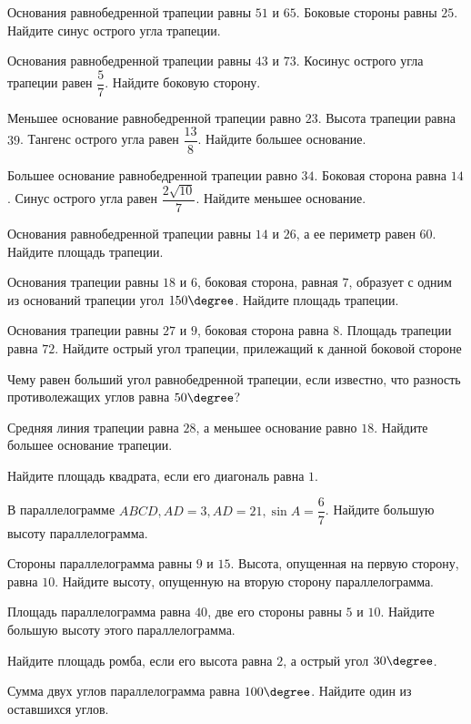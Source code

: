 \begin{class}[number=7]
	\begin{listofex}
		\item Основания равнобедренной трапеции равны \(51\) и \(65\). Боковые стороны равны \(25\). Найдите синус острого угла трапеции.
		\item Основания равнобедренной трапеции равны \(43\) и \(73\). Косинус острого угла трапеции равен \(\dfrac{5}{7}\).  Найдите боковую сторону.
		\item Меньшее основание равнобедренной трапеции равно \(23\). Высота трапеции равна \(39\). Тангенс острого угла равен \(\dfrac{13}{8}\).  Найдите большее основание.
		\item Большее основание равнобедренной трапеции равно \(34\). Боковая сторона равна \(14\). Синус острого угла равен \( \dfrac{2\sqrt{10}}{7} \).  Найдите меньшее основание.
		\item Основания равнобедренной трапеции равны \(14\) и \(26\), а ее периметр равен \(60\). Найдите площадь трапеции.
		\item Основания трапеции равны \(18\) и \(6\), боковая сторона, равная \(7\), образует с одним из оснований трапеции угол \(150 \degree \). Найдите площадь трапеции.
		\item Основания трапеции равны \(27\) и \(9\), боковая сторона равна \(8\). Площадь трапеции равна \(72\). Найдите острый угол трапеции, прилежащий к данной боковой стороне
		\item Чему равен больший угол равнобедренной трапеции, если известно, что разность противолежащих углов равна \(50 \degree \)? 
		\item Средняя линия трапеции равна \(28\), а меньшее основание равно \(18\). Найдите большее основание трапеции.
		
		\item Найдите площадь квадрата, если его диагональ равна \(1\).
		\item В параллелограмме \(ABCD, AD  =  3, AD  =  21,  \sin A= \dfrac{6}{7}\).  Найдите большую высоту параллелограмма.
		\item Стороны параллелограмма равны \(9\) и \(15\). Высота, опущенная на первую сторону, равна \(10\). Найдите высоту, опущенную на вторую сторону параллелограмма.
		\item Площадь параллелограмма равна \(40\), две его стороны равны \(5\) и \(10\). Найдите большую высоту этого параллелограмма.
		\item Найдите площадь ромба, если его высота равна \(2\), а острый угол \(30 \degree \).
		\item Сумма двух углов параллелограмма равна \(100\degree \). Найдите один из оставшихся углов.
		

\end{listofex}
\end{class}
